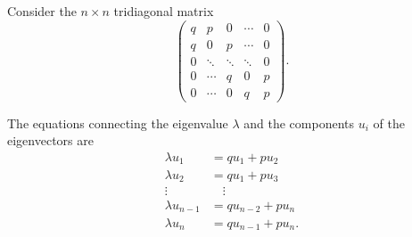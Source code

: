 \documentclass[12pt]{article}
\begin{document}
\begin{solution}
    Consider the \( n \times n \) tridiagonal matrix
    \[
        \begin{pmatrix}
            q & p & 0 & \cdots & 0 \\
            q & 0 & p & \cdots & 0 \\
            0 & \ddots & \ddots & \ddots& 0 \\
            0 & \cdots & q & 0 & p \\
            0 & \cdots & 0 & q & p
        \end{pmatrix}
        .
    \]

    The equations connecting the eigenvalue \( \lambda \) and the
    components \( u_i \) of the eigenvectors are
    \begin{align}
        \lambda u_1 &= q u_1 + p u_2%
        \label{fastestmixing:eq:bcone} \\
        \lambda u_2 &= q u_{1} + p u_{3}%
        \label{fastestmixing:eq:ordertwo}\\
        \vdots &\quad \vdots \\
        \lambda u_{n-1} &= q u_{n-2} + p u_{n}%
        \label{fastestmixing:eq:orderthree} \\
        \lambda u_n &= q u_{n-1} + p u_n.%
        \label{fastestmixing:eq:bcfour}
    \end{align}


\end{solution}
\end{document}
